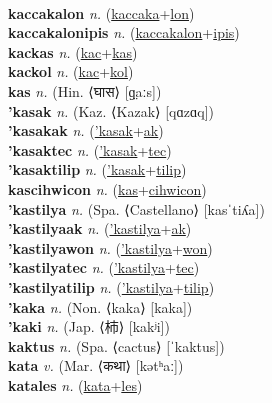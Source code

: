  \label{kaccaka} \\
\textbf{kaccakalon} \textit{n.} (\hyperref[kaccaka]{kaccaka}+\hyperref[lon]{lon})
 \label{kaccakalon} \\
\textbf{kaccakalonipis} \textit{n.} (\hyperref[kaccakalon]{kaccakalon}+\hyperref[ipis]{ipis})
 \label{kaccakalonipis} \\
\textbf{kackas} \textit{n.} (\hyperref[kac]{kac}+\hyperref[kas]{kas})
 \label{kackas} \\
\textbf{kackol} \textit{n.} (\hyperref[kac]{kac}+\hyperref[kol]{kol})
 \label{kackol} \\
\textbf{kas} \textit{n.} (Hin. ⟨घास⟩ [ɡ̤aːs])
 \label{kas} \\
\textbf{'kasak} \textit{n.} (Kaz. ⟨Kazak⟩ [qɑzɑq])
 \label{'kasak} \\
\textbf{'kasakak} \textit{n.} (\hyperref['kasak]{'kasak}+\hyperref[ak]{ak})
 \label{'kasakak} \\
\textbf{'kasaktec} \textit{n.} (\hyperref['kasak]{'kasak}+\hyperref[tec]{tec})
 \label{'kasaktec} \\
\textbf{'kasaktilip} \textit{n.} (\hyperref['kasak]{'kasak}+\hyperref[tilip]{tilip})
 \label{'kasaktilip} \\
\textbf{kascihwicon} \textit{n.} (\hyperref[kas]{kas}+\hyperref[cihwicon]{cihwicon})
 \label{kascihwicon} \\
\textbf{'kastilya} \textit{n.} (Spa. ⟨Castellano⟩ [kasˈtiʎa])
 \label{'kastilya} \\
\textbf{'kastilyaak} \textit{n.} (\hyperref['kastilya]{'kastilya}+\hyperref[ak]{ak})
 \label{'kastilyaak} \\
\textbf{'kastilyawon} \textit{n.} (\hyperref['kastilya]{'kastilya}+\hyperref[won]{won})
 \label{'kastilyawon} \\
\textbf{'kastilyatec} \textit{n.} (\hyperref['kastilya]{'kastilya}+\hyperref[tec]{tec})
 \label{'kastilyatec} \\
\textbf{'kastilyatilip} \textit{n.} (\hyperref['kastilya]{'kastilya}+\hyperref[tilip]{tilip})
 \label{'kastilyatilip} \\
\textbf{'kaka} \textit{n.} (Non. ⟨kaka⟩ [kaka])
 \label{'kaka} \\
\textbf{'kaki} \textit{n.} (Jap. ⟨柿⟩ [kakʲi])
 \label{'kaki} \\
\textbf{kaktus} \textit{n.} (Spa. ⟨cactus⟩ [ˈkaktus])
 \label{kaktus} \\
\textbf{kata} \textit{v.} (Mar. ⟨कथा⟩ [kətʰaː])
 \label{kata} \\
\textbf{katales} \textit{n.} (\hyperref[kata]{kata}+\hyperref[les]{les})

